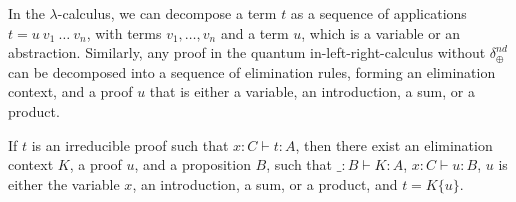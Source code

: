 \documentclass[screen, sigconf,authorversion,nonacm]{acmart}
\theoremstyle{acmdefinition}
\numberwithin{equation}{section}
\newcommand\elimplus{\delta_{\oplus}}
\begin{document}
In the $\lambda$-calculus, we can decompose a term $t$ as a sequence of
applications $t = u~v_1~\ldots~v_n$, with terms $v_1, \ldots, v_n$ and a term
$u$, which is a variable or an abstraction. Similarly, any proof in the quantum
in-left-right-calculus without $\elimplus^{nd}$ can be decomposed into a
sequence of elimination rules, forming an elimination context, and a proof $u$
that is either a variable, an introduction, a sum, or a product.

\begin{lemma}
  \label{elim}
  If $t$ is an irreducible proof such that $x:C \vdash t:A$, then there
  exist an elimination context $K$, a proof $u$, and a proposition $B$,
  such that $\_:B \vdash K:A$, $x:C \vdash u:B$, $u$ is either the
  variable $x$, an introduction, a sum, or a product, and $t = K\{u\}$.
\end{lemma}
\end{document}
